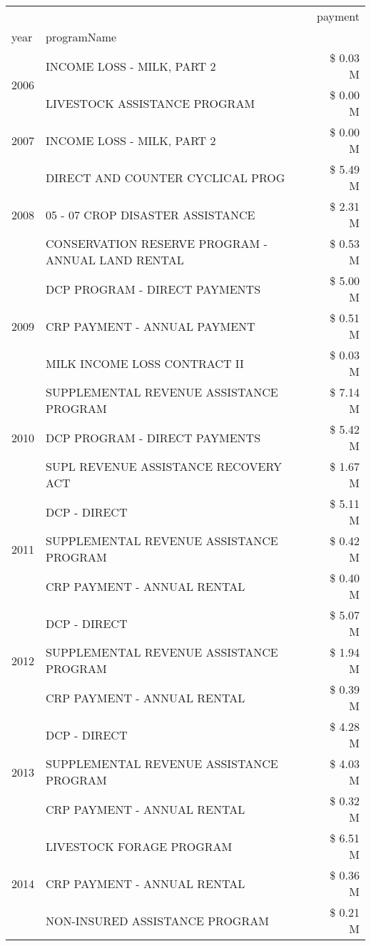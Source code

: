 \begin{tabular}{llr}
\toprule
 &  & payment \\
year & programName &  \\
\midrule
\multirow[t]{2}{*}{2006} & INCOME LOSS - MILK, PART 2 & \$ 0.03 M \\
 & LIVESTOCK ASSISTANCE PROGRAM & \$ 0.00 M \\
\cline{1-3}
2007 & INCOME LOSS - MILK, PART 2 & \$ 0.00 M \\
\cline{1-3}
\multirow[t]{3}{*}{2008} & DIRECT AND COUNTER CYCLICAL PROG & \$ 5.49 M \\
 & 05 - 07 CROP DISASTER ASSISTANCE & \$ 2.31 M \\
 & CONSERVATION RESERVE PROGRAM - ANNUAL LAND RENTAL & \$ 0.53 M \\
\cline{1-3}
\multirow[t]{3}{*}{2009} & DCP PROGRAM - DIRECT PAYMENTS & \$ 5.00 M \\
 & CRP PAYMENT - ANNUAL PAYMENT & \$ 0.51 M \\
 & MILK INCOME LOSS CONTRACT II & \$ 0.03 M \\
\cline{1-3}
\multirow[t]{3}{*}{2010} & SUPPLEMENTAL REVENUE ASSISTANCE PROGRAM & \$ 7.14 M \\
 & DCP PROGRAM - DIRECT PAYMENTS & \$ 5.42 M \\
 & SUPL REVENUE ASSISTANCE RECOVERY ACT & \$ 1.67 M \\
\cline{1-3}
\multirow[t]{3}{*}{2011} & DCP - DIRECT & \$ 5.11 M \\
 & SUPPLEMENTAL REVENUE ASSISTANCE PROGRAM & \$ 0.42 M \\
 & CRP PAYMENT - ANNUAL RENTAL & \$ 0.40 M \\
\cline{1-3}
\multirow[t]{3}{*}{2012} & DCP - DIRECT & \$ 5.07 M \\
 & SUPPLEMENTAL REVENUE ASSISTANCE PROGRAM & \$ 1.94 M \\
 & CRP PAYMENT - ANNUAL RENTAL & \$ 0.39 M \\
\cline{1-3}
\multirow[t]{3}{*}{2013} & DCP - DIRECT & \$ 4.28 M \\
 & SUPPLEMENTAL REVENUE ASSISTANCE PROGRAM & \$ 4.03 M \\
 & CRP PAYMENT - ANNUAL RENTAL & \$ 0.32 M \\
\cline{1-3}
\multirow[t]{3}{*}{2014} & LIVESTOCK FORAGE PROGRAM & \$ 6.51 M \\
 & CRP PAYMENT - ANNUAL RENTAL & \$ 0.36 M \\
 & NON-INSURED ASSISTANCE PROGRAM & \$ 0.21 M \\

\end{tabular}
